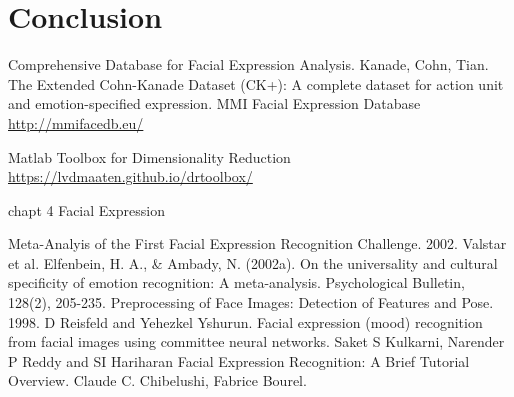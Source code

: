 \documentclass[10pt,twocolumn,letterpaper]{article}
\begin{document}
\section{Conclusion}


\begin{thebibliography}{1}
 Comprehensive Database for Facial Expression Analysis. Kanade, Cohn, Tian.
 The Extended Cohn-Kanade Dataset (CK+): A complete dataset for action unit and emotion-specified expression.
 MMI Facial Expression Database \url{http://mmifacedb.eu/}

 Matlab Toolbox for Dimensionality Reduction \url{https://lvdmaaten.github.io/drtoolbox/}

 chapt 4 Facial Expression

 Meta-Analyis of the First Facial Expression Recognition Challenge. 2002. Valstar et al.
 Elfenbein, H. A., \& Ambady, N. (2002a). On the universality and cultural specificity of emotion recognition: A meta-analysis. Psychological Bulletin, 128(2), 205-235. 
 Preprocessing of Face Images: Detection of Features and Pose. 1998. D Reisfeld and Yehezkel Yshurun.
 Facial expression (mood) recognition from facial images using committee neural networks. Saket S Kulkarni, Narender P Reddy and SI Hariharan
 Facial Expression Recognition: A Brief Tutorial Overview. Claude C. Chibelushi, Fabrice Bourel.
\end{thebibliography}
\end{document}
